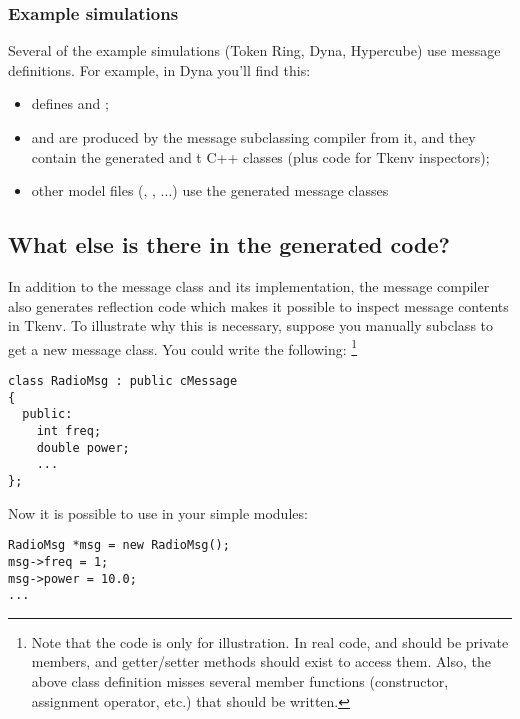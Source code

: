 \subsubsection{Example simulations}

Several of the example simulations (Token Ring, Dyna, Hypercube)
use message definitions. For example, in Dyna you'll find this:

\begin{itemize}
 \item {} defines  and ;
 \item {} and  are produced
   by the message subclassing compiler from it, and they contain
   the generated  and t
   C++ classes (plus code for Tkenv inspectors);
 \item other model files (, , ...)
   use the generated message classes
\end{itemize}



\subsection{What else is there in the generated code?}

In addition to the message class and its implementation,
the message compiler also generates reflection code which makes it
possible to inspect message contents in Tkenv.
To illustrate why this is necessary, suppose you manually subclass
 to get a new message class. You could write the following:
  \footnote{Note that the code is only for illustration.
  In real code,  and  should be private members,
  and getter/setter methods should exist to access them.
  Also, the above class definition misses several member functions
  (constructor, assignment operator, etc.) that should be written.}

\begin{verbatim}
class RadioMsg : public cMessage
{
  public:
    int freq;
    double power;
    ...
};
\end{verbatim}

Now it is possible to use  in your simple modules:

\begin{verbatim}
RadioMsg *msg = new RadioMsg();
msg->freq = 1;
msg->power = 10.0;
...
\end{verbatim}

